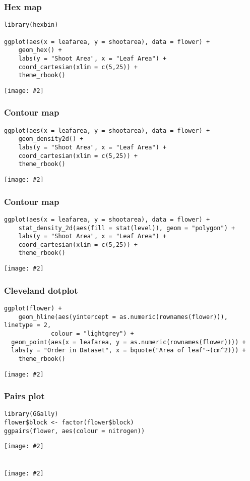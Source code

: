 \documentclass{beamer}
\newcommand{\fig}[2]{\centerline{\texttt{[image: \#2]}}}
\newcommand{\bfr}[1]{\begin{frame}[fragile]\frametitle{{ #1 }}}
\begin{document}
\bfr{Hex map}\scriptsize
\begin{verbatim}
library(hexbin)

ggplot(aes(x = leafarea, y = shootarea), data = flower) +
    geom_hex() +
    labs(y = "Shoot Area", x = "Leaf Area") +
    coord_cartesian(xlim = c(5,25)) +
    theme_rbook()
\end{verbatim}
\fig{0.7}{hex-1.png}
\end{frame}

\bfr{Contour map}\scriptsize
\begin{verbatim}
ggplot(aes(x = leafarea, y = shootarea), data = flower) +
    geom_density2d() +
    labs(y = "Shoot Area", x = "Leaf Area") +
    coord_cartesian(xlim = c(5,25)) +
    theme_rbook()
\end{verbatim}
\fig{0.7}{contour-1.png}
\end{frame}

\bfr{Contour map}\scriptsize
\begin{verbatim}
ggplot(aes(x = leafarea, y = shootarea), data = flower) +
    stat_density_2d(aes(fill = stat(level)), geom = "polygon") +
    labs(y = "Shoot Area", x = "Leaf Area") +
    coord_cartesian(xlim = c(5,25)) +
    theme_rbook()
\end{verbatim}
\fig{0.7}{stat-contour-1.png}
\end{frame}

\bfr{Cleveland dotplot}\scriptsize
\begin{verbatim}
ggplot(flower) + 
    geom_hline(aes(yintercept = as.numeric(rownames(flower))), linetype = 2,
             colour = "lightgrey") +
  geom_point(aes(x = leafarea, y = as.numeric(rownames(flower)))) +
  labs(y = "Order in Dataset", x = bquote("Area of leaf"~(cm^2))) +
    theme_rbook()
\end{verbatim}
\fig{0.7}{dotpot-1.png}
\end{frame}

\bfr{Pairs plot}\scriptsize
\vspace{-0.5cm}
\begin{verbatim}
library(GGally)
flower$block <- factor(flower$block)
ggpairs(flower, aes(colour = nitrogen))
\end{verbatim}
\fig{1.1}{pairs-plot-1.png}
\end{frame}


\bfr{}\scriptsize
\begin{verbatim}

\end{verbatim}
\fig{0.7}{quantile-lines-1.png}
\end{frame}
\end{document}
